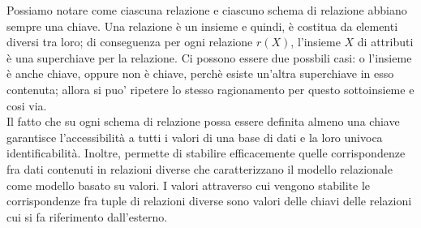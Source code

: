 \documentclass[12pt]{report}
\begin{document}
 	Possiamo notare come ciascuna relazione e ciascuno schema di relazione abbiano sempre una chiave. Una relazione è un insieme e quindi, è costitua da elementi diversi tra loro; di conseguenza per ogni relazione $r(X)$, l'insieme $X$ di attributi è una superchiave per la relazione. Ci possono essere due possbili casi: o l'insieme è anche chiave, oppure non è chiave, perchè esiste un'altra superchiave in esso contenuta; allora si puo' ripetere lo stesso ragionamento per questo sottoinsieme e cosi via. \\
 	Il fatto che su ogni schema di relazione possa essere definita almeno una chiave garantisce l'accessibilità a tutti i valori di una base di dati e la loro univoca identificabilità. Inoltre, permette di stabilire efficacemente quelle corrispondenze fra dati contenuti in relazioni diverse che caratterizzano il modello relazionale come modello basato su valori. I valori attraverso cui vengono stabilite le corrispondenze fra tuple di relazioni diverse sono valori delle chiavi delle relazioni cui si fa riferimento dall'esterno.
\end{document}
